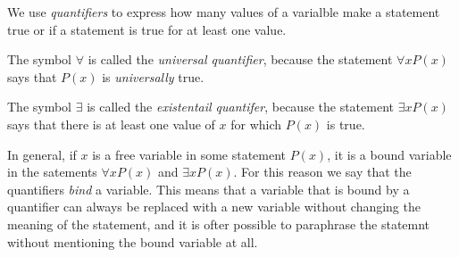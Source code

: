 We use \textit{quantifiers} to express how many values of a varialble make a statement true or if a statement is true for at least one value.

The symbol \(\forall\) is called the \textit{universal quantifier}, because the statement \(\forall x P(x)\) says that \(P(x)\) is \textit{universally} true.

The symbol \(\exists\) is called the \textit{existentail quantifer}, because the statement \(\exists x P(x)\) says that there is at least one value of \(x\) for which \(P(x)\) is true.

In general, if $x$ is a free variable in some statement $P(x)$, it is a bound variable in the satements $\forall x P(x)$ and $\exists x P(x)$. For this reason we say that the quantifiers \textit{bind} a variable. This means that a variable that is bound by a quantifier can always be replaced with a new variable without changing the meaning of the statement, and it is ofter possible to paraphrase the statemnt without mentioning the bound variable at all.
